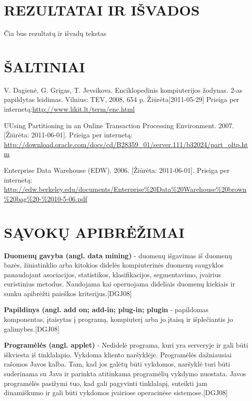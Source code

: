\documentclass[12pt,a4paper,titlepage]{article}
\begin{document}
\section*{REZULTATAI IR IŠVADOS}
Čia bus rezultatų ir išvadų tekstas

\section*{ŠALTINIAI}

\begin{thebibliography}{99}
V. Dagienė, G. Grigas, T. Jevsikova. Enciklopedinis kompiuterijos žodynas. 2-as papildytas leidimas. Vilnius: TEV, 2008, 654 p. Žiūrėta[2011-05-29] Prieiga per internetą:\url{http://www.likit.lt/term/enc.html}

 UUsing Partitioning in an Online Transaction Processing Environment. 2007. [Žiūrėta: 2011-06-01]. Prieiga per internetą: \url{http://download.oracle.com/docs/cd/B28359_01/server.111/b32024/part_oltp.htm}
 
Enterprise Data Warehouse (EDW). 2006. [Žiūrėta: 2011-06-01]. Prieiga per internetą: \url{http://edw.berkeley.edu/documents/Enterprise%20Data%20Warehouse%20brown%20bag%20-%2010-5-06.pdf}

\end{thebibliography}

\section*{SĄVOKŲ APIBRĖŽIMAI}

\textbf{Duomenų gavyba (angl. data mining)} - duomenų išgavimas iš duomenų bazės, žiniatinklio arba kitokios didelės kompiuterinės duomenų saugyklos panaudojant asociacijos, statistikos, klasifikacijos, segmentavimo, įvairius euristinius metodus. Naudojama kai operuojama dideliais duomenų kiekiais ir sunku apibrėžti paieškos kriterijus.[DGJ08]

\textbf{Papildinys (angl. add on; add-in; plug-in; plugin} - papildomas komponentas, įtaisytas į programą, kompiuterį arba jo įtaisą ir išplečiantis jo galimybes.[DGJ08]

\textbf{Programėlės (angl. applet)} - Nedidelė programa, kuri yra serveryje ir gali būti iškviesta iš tinklalapio. Vykdoma kliento naršyklėje.
Programėlės dažniausiai rašomos Javos kalba. Tam, kad jos galėtų būti vykdomos, naršyklė turi būti suderinama su Java ir parinkta atitinkama programėlių vykdymo nuostata. Javos programėlės pasižymi tuo, kad gali pagyvinti tinklalapį, suteikti jam dinamiškumo ir gali būti vykdomos įvairiose operacinėse sistemose.[DGJ08]
\end{document}

